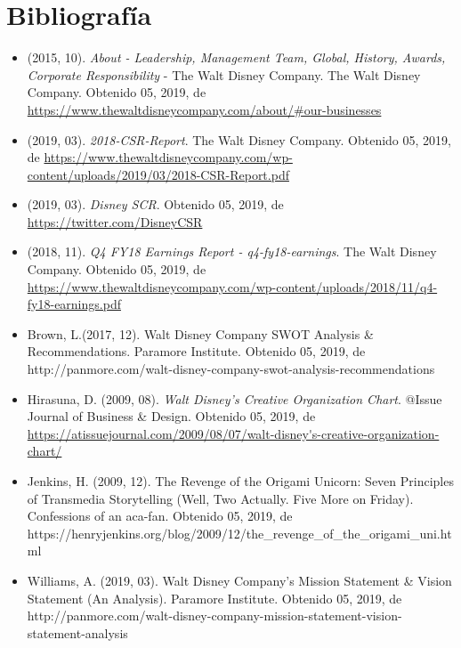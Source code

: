 \section{Bibliografía}

\begin{itemize}

\item
(2015, 10). \textit{About - Leadership, Management Team, Global, History, Awards, Corporate Responsibility} - The Walt Disney Company. The Walt Disney Company. Obtenido 05, 2019, de \url{https://www.thewaltdisneycompany.com/about/#our-businesses}

\item
(2019, 03). \textit{2018-CSR-Report}. The Walt Disney Company. Obtenido 05, 2019, de \url{https://www.thewaltdisneycompany.com/wp-content/uploads/2019/03/2018-CSR-Report.pdf}

\item
(2019, 03). \textit{Disney SCR}. Obtenido 05, 2019, de \url{https://twitter.com/DisneyCSR}

\item
(2018, 11). \textit{Q4 FY18 Earnings Report - q4-fy18-earnings}. The Walt Disney Company. Obtenido 05, 2019, de \url{https://www.thewaltdisneycompany.com/wp-content/uploads/2018/11/q4-fy18-earnings.pdf}

\item
Brown, L.(2017, 12). Walt Disney Company SWOT Analysis \& Recommendations. Paramore Institute. Obtenido 05, 2019, de http://panmore.com/walt-disney-company-swot-analysis-recommendations

\item
Hirasuna, D. (2009, 08). \textit{Walt Disney’s Creative Organization Chart}. @Issue Journal of Business \& Design. Obtenido 05, 2019, de \url{https://atissuejournal.com/2009/08/07/walt-disney's-creative-organization-chart/}

\item
Jenkins, H. (2009, 12). The Revenge of the Origami Unicorn: Seven Principles of Transmedia Storytelling (Well, Two Actually. Five More on Friday). Confessions of an aca-fan. Obtenido 05, 2019, de https://henryjenkins.org/blog/2009/12/the_revenge_of_the_origami_uni.html

\item
Williams, A. (2019, 03). Walt Disney Company’s Mission Statement \& Vision Statement (An Analysis). Paramore Institute. Obtenido 05, 2019, de http://panmore.com/walt-disney-company-mission-statement-vision-statement-analysis


\end{itemize}